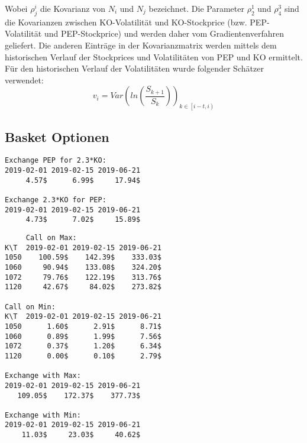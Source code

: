 \documentclass[a4paper,12pt]{article}
\numberwithin[\arabic]{Satz}{section}
\begin{document}
		Wobei $\rho^{i}_j$ die Kovarianz von $N_i$ und $N_j$ bezeichnet.
		Die Parameter $\rho^1_2$ und $\rho^3_4$ sind die Kovarianzen zwischen KO-Volatilität und KO-Stockprice (bzw. PEP-Volatilität und PEP-Stockprice) und werden daher vom Gradientenverfahren geliefert. Die anderen Einträge in der Kovarianzmatrix werden mittels dem historischen Verlauf der Stockprices und Volatilitäten von PEP und KO ermittelt. 
		Für den historischen Verlauf der Volatilitäten wurde folgender Schätzer verwendet:
		\begin{equation*}
		v_i=Var(ln(\frac{S_{k+1}}{S_k}))_{k\in\left[i-t,i\right)}
		\end{equation*}
		
		
	\subsection*{Basket Optionen}
	
	
	
	
	
	
	
	
	
	
	
	
	
	
	
	
	
	
	


\begin{verbatim}
Exchange PEP for 2.3*KO:
2019-02-01 2019-02-15 2019-06-21
     4.57$      6.99$     17.94$ 

Exchange 2.3*KO for PEP:
2019-02-01 2019-02-15 2019-06-21
     4.73$      7.02$     15.89$
\end{verbatim}
     
\begin{verbatim}
     Call on Max:
K\T  2019-02-01 2019-02-15 2019-06-21
1050    100.59$    142.39$    333.03$ 
1060     90.94$    133.08$    324.20$ 
1072     79.76$    122.19$    313.76$ 
1120     42.67$     84.02$    273.82$ 

Call on Min:
K\T  2019-02-01 2019-02-15 2019-06-21
1050      1.60$      2.91$      8.71$ 
1060      0.89$      1.99$      7.56$ 
1072      0.37$      1.20$      6.34$ 
1120      0.00$      0.10$      2.79$ 

Exchange with Max:
2019-02-01 2019-02-15 2019-06-21
   109.05$    172.37$    377.73$ 

Exchange with Min:
2019-02-01 2019-02-15 2019-06-21
    11.03$     23.03$     40.62$ 
    \end{verbatim}
	
	
	
		
	
\end{document}
